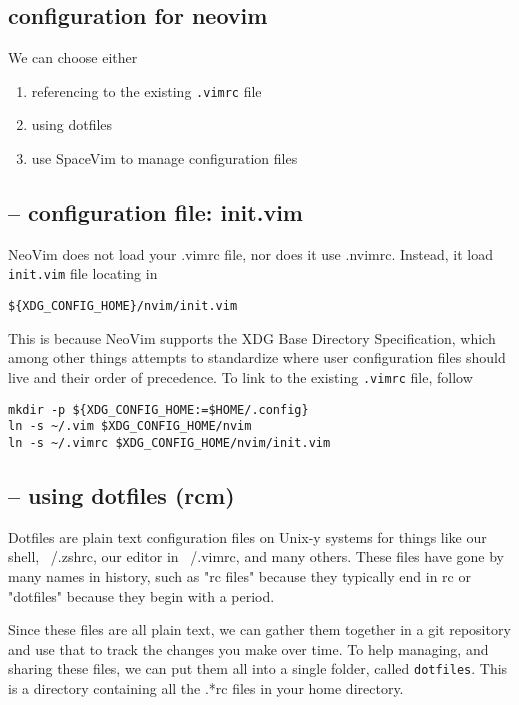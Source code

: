 \subsection{configuration for neovim}

We can choose either
\begin{enumerate}
  \item referencing to the existing \verb!.vimrc! file
  
  \item using dotfiles
  
  \item use SpaceVim to manage configuration files
\end{enumerate}

\subsection{-- configuration file: init.vim}

NeoVim does not load your .vimrc file, nor does it use .nvimrc.
Instead, it load \verb!init.vim! file locating in
\begin{verbatim}
${XDG_CONFIG_HOME}/nvim/init.vim
\end{verbatim}
This is because NeoVim supports the XDG Base Directory Specification, which
among other things attempts to standardize where user configuration files should
live and their order of precedence. To link to the existing \verb!.vimrc! file,
follow
\begin{verbatim}
mkdir -p ${XDG_CONFIG_HOME:=$HOME/.config}
ln -s ~/.vim $XDG_CONFIG_HOME/nvim
ln -s ~/.vimrc $XDG_CONFIG_HOME/nvim/init.vim
\end{verbatim}

\subsection{-- using dotfiles (rcm)}
\label{sec:dotfiles}

Dotfiles are plain text configuration files on Unix-y systems for things like
our shell, ~/.zshrc, our editor in ~/.vimrc, and many others. 
These files have gone by many names in history, such as "rc files" because they
typically end in rc or "dotfiles" because they begin with a period.

Since these files are all plain text, we can gather them together in a git
repository and use that to track the changes you make over time. 
To help managing, and sharing these files, we can put them all into a single
folder, called \verb!dotfiles!. This is a directory containing all the .*rc
files in your home directory.

